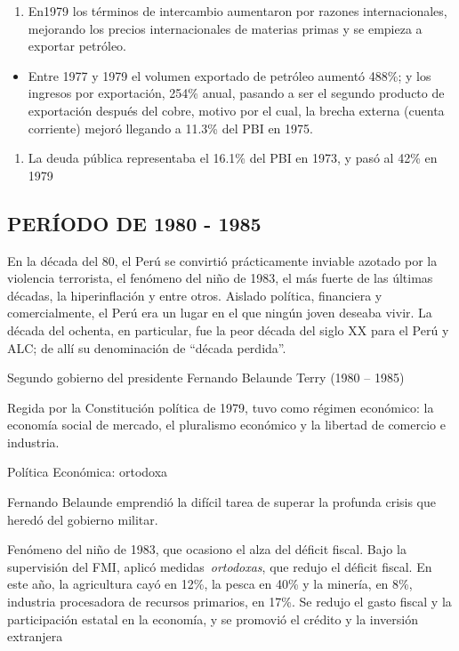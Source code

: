 \documentclass[
  jou,
  floatsintext,
  longtable,
  a4paper,
  nolmodern,
  notxfonts,
  notimes,
  colorlinks=true,linkcolor=blue,citecolor=blue,urlcolor=blue]{apa7}
\providecommand{\tightlist}{%
  \setlength{\itemsep}{0pt}\setlength{\parskip}{0pt}}
\begin{document}
\begin{enumerate}
\def\labelenumi{\arabic{enumi}.}
\setcounter{enumi}{5}
\tightlist
\item
  En1979 los términos de intercambio aumentaron por razones
  internacionales, mejorando los precios internacionales de materias
  primas y se empieza a exportar petróleo.
\end{enumerate}

\begin{itemize}
\tightlist
\item
  Entre 1977 y 1979 el volumen exportado de petróleo aumentó 488\%; y
  los ingresos por exportación, 254\% anual, pasando a ser el segundo
  producto de exportación después del cobre, motivo por el cual, la
  brecha externa (cuenta corriente) mejoró llegando a 11.3\% del PBI en
  1975.
\end{itemize}

\begin{enumerate}
\def\labelenumi{\arabic{enumi}.}
\setcounter{enumi}{6}
\tightlist
\item
  La deuda pública representaba el 16.1\% del PBI en 1973, y pasó al
  42\% en 1979
\end{enumerate}

\subsection{PERÍODO DE 1980 - 1985}\label{peruxedodo-de-1980---1985}

En la década del 80, el Perú se convirtió prácticamente inviable azotado
por la violencia terrorista, el fenómeno del niño de 1983, el más fuerte
de las últimas décadas, la hiperinflación y entre otros. Aislado
política, financiera y comercialmente, el Perú era un lugar en el que
ningún joven deseaba vivir. La década del ochenta, en particular, fue la
peor década del siglo XX para el Perú y ALC; de allí su denominación de
``década perdida''.

Segundo gobierno del presidente Fernando Belaunde Terry (1980 -- 1985)

Regida por la Constitución política de 1979, tuvo como régimen
económico: la economía social de mercado, el pluralismo económico y la
libertad de comercio e industria.

Política Económica: ortodoxa

Fernando Belaunde emprendió la difícil tarea de superar la profunda
crisis que heredó del gobierno militar.

Fenómeno del niño de 1983, que ocasiono el alza del déficit fiscal. Bajo
la supervisión del FMI, aplicó medidas~\emph{ortodoxas}, que redujo el
déficit fiscal. En este año, la agricultura cayó en 12\%, la pesca en
40\% y la minería, en 8\%, industria procesadora de recursos primarios,
en 17\%. Se redujo el gasto fiscal y la participación estatal en la
economía, y se promovió el crédito y la inversión extranjera
\end{document}
